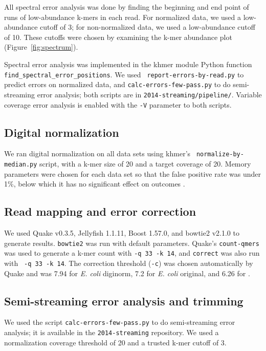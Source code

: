 \documentclass{article}
\begin{document}
All spectral error analysis was done by finding the beginning and end
point of runs of low-abundance k-mers in each read.  For normalized
data, we used a low-abundance cutoff of 3; for non-normalized data, we
used a low-abundance cutoff of 10.  These cutoffs were chosen by
examining the k-mer abundance plot (Figure~\ref{fig:spectrum}).

Spectral error analysis was implemented in the khmer module Python
function {\tt find\_spectral\_error\_positions}. We used {\tt
  report-errors-by-read.py} to predict errors on normalized data, and
{\tt calc-errors-few-pass.py} to do semi-streaming error analysis;
both scripts are in {\tt 2014-streaming/pipeline/}.  Variable coverage
error analysis is enabled with the {\tt -V} parameter to both scripts.

\subsection{Digital normalization}

We ran digital normalization on all data sets using khmer's {\tt
  normalize-by-median.py} script, with a k-mer size of 20 and a target
coverage of 20.  Memory parameters were chosen for each data set so
that the false positive rate was under 1\%, below which it has no
significant effect on outcomes \cite{Zhang2014}.

\subsection{Read mapping and error correction}

We used Quake v0.3.5, Jellyfish 1.1.11, Boost 1.57.0, and bowtie2
v2.1.0 to generate results.  {\tt bowtie2} was run with default
parameters.  Quake's {\tt count-qmers} was used to generate a k-mer
count with {\tt -q 33 -k 14}, and {\tt correct} was also run with {\tt
  -q 33 -k 14}.  The correction threshold ({\tt -c}) was chosen
automatically by Quake and was 7.94 for {\em E. coli} diginorm, 7.2
for {\em E. coli} original, and 6.26 for .

\subsection{Semi-streaming error analysis and trimming}

We used the script {\tt calc-errors-few-pass.py} to do semi-streaming
error analysis; it is available in the {\tt 2014-streaming}
repository.  We used a normalization coverage threshold of 20 and a trusted
k-mer cutoff of 3.
\end{document}
